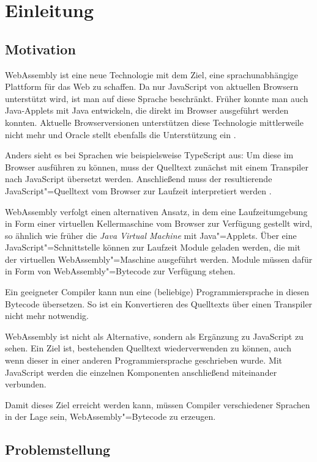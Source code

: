 \chapter{Einleitung}

\section{Motivation}

WebAssembly \cite{WebAssemblyWebsite} ist eine neue Technologie mit dem Ziel, eine sprachunabhängige Plattform für das Web zu schaffen. Da nur JavaScript von aktuellen Browsern unterstützt wird, ist man auf diese Sprache beschränkt. Früher konnte man auch Java-Applets mit Java entwickeln, die direkt im Browser ausgeführt werden konnten. Aktuelle Browserversionen unterstützen diese Technologie mittlerweile nicht mehr und Oracle stellt ebenfalls die Unterstützung ein \cite{OracleJavaSESupportRoadmap}.

Anders sieht es bei Sprachen wie beispielsweise TypeScript aus: Um diese im Browser ausführen zu können, muss der Quelltext zunächst mit einem Transpiler nach JavaScript übersetzt werden. Anschließend muss der resultierende JavaScript"=Quelltext vom Browser zur Laufzeit interpretiert werden \cite{TypeScript}.

WebAssembly verfolgt einen alternativen Ansatz, in dem eine Laufzeitumgebung in Form einer virtuellen Kellermaschine vom Browser zur Verfügung gestellt wird, so ähnlich wie früher die \emph{Java Virtual Machine} mit Java"=Applets. Über eine JavaScript"=Schnittstelle können zur Laufzeit Module geladen werden, die mit der virtuellen WebAssembly"=Maschine ausgeführt werden. Module müssen dafür in Form von WebAssembly"=Bytecode zur Verfügung stehen.

Ein geeigneter Compiler kann nun eine (beliebige) Programmiersprache in diesen Bytecode übersetzen. So ist ein Konvertieren des Quelltexts über einen Transpiler nicht mehr notwendig.

WebAssembly ist nicht als Alternative, sondern als Ergänzung zu JavaScript zu sehen. Ein Ziel ist, bestehenden Quelltext wiederverwenden zu können, auch wenn dieser in einer anderen Programmiersprache geschrieben wurde. Mit JavaScript werden die einzelnen Komponenten anschließend miteinander verbunden.

Damit dieses Ziel erreicht werden kann, müssen Compiler verschiedener Sprachen in der Lage sein, WebAssembly"=Bytecode zu erzeugen.

\section{Problemstellung}

